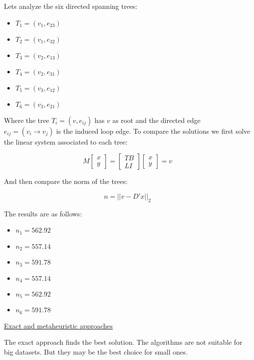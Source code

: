 \documentclass[a4paper,11pt]{article}
\begin{document}
Lets analyze the six directed spanning trees:

\begin{itemize}
	\item $T_1=(v_1,e_{23})$
	\item $T_2=(v_1,e_{32})$
	\item $T_3=(v_2,e_{13})$
	\item $T_4=(v_2,e_{31})$
	\item $T_5=(v_3,e_{12})$
	\item $T_6=(v_3,e_{21})$
\end{itemize}

Where the tree $T_i = (v,e_{ij})$ has $v$ as root and the directed edge 
$e_{ij} = (v_i \rightarrow v_j)$ is the induced loop edge. To compare 
the solutions we first solve the linear system associated to each tree: 

\begin{equation}
     M \begin{bmatrix}
         x \\
         y
	\end{bmatrix}=\begin{bmatrix}
         T B\\
         L I
	\end{bmatrix}
	\begin{bmatrix}
         x \\
         y
	\end{bmatrix} = v
\end{equation}

And then compare the norm of the trees:

$$n = ||v-D'x||_2$$

The results are as follows:

\begin{itemize}
	\item $n_1=562.92$
	\item $n_2=557.14$
	\item $n_3=591.78$
	\item $n_4=557.14$
	\item $n_5=562.92$
	\item $n_6=591.78$
\end{itemize}

\bigskip

\underline{Exact and metaheuristic approaches}

\bigskip

The exact approach finds the best solution. The algorithms are not 
suitable for big datasets. But they may be the best choice for small 
ones.
\end{document}
